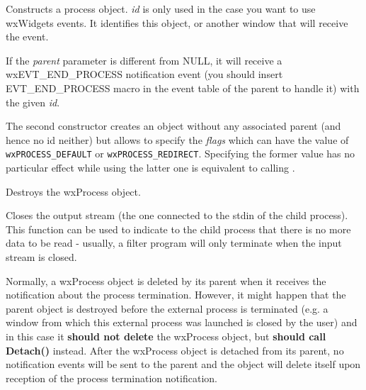 
Constructs a process object. {\it id} is only used in the case you want to
use wxWidgets events. It identifies this object, or another window that will
receive the event.

If the {\it parent} parameter is different from NULL, it will receive
a wxEVT\_END\_PROCESS notification event (you should insert EVT\_END\_PROCESS
macro in the event table of the parent to handle it) with the given {\it id}.

The second constructor creates an object without any associated parent (and
hence no id neither) but allows to specify the {\it flags} which can have the
value of {\tt wxPROCESS\_DEFAULT} or {\tt wxPROCESS\_REDIRECT}. Specifying the
former value has no particular effect while using the latter one is equivalent
to calling .





\label{wxprocessdtor}


Destroys the wxProcess object.

\label{wxprocesscloseoutput}


Closes the output stream (the one connected to the stdin of the child
process). This function can be used to indicate to the child process that
there is no more data to be read - usually, a filter program will only
terminate when the input stream is closed.

\label{wxprocessdetach}


Normally, a wxProcess object is deleted by its parent when it receives the
notification about the process termination. However, it might happen that the
parent object is destroyed before the external process is terminated (e.g. a
window from which this external process was launched is closed by the user)
and in this case it {\bf should not delete} the wxProcess object, but
{\bf should call Detach()} instead. After the wxProcess object is detached
from its parent, no notification events will be sent to the parent and the
object will delete itself upon reception of the process termination
notification.

